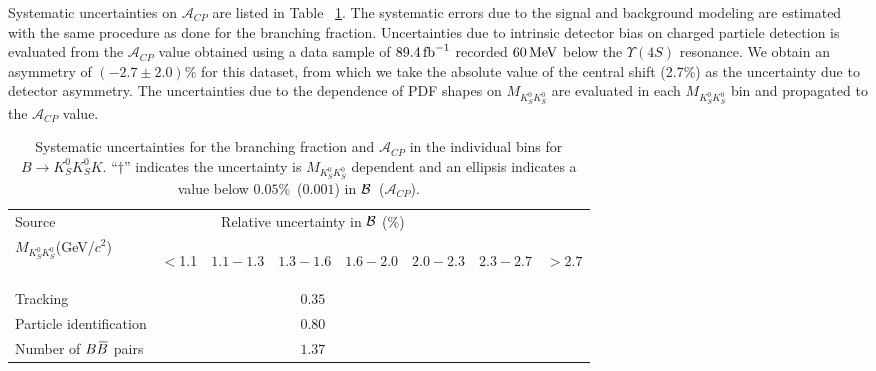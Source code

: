 \documentclass[aps,prl,preprint,tightenlines,superscriptaddress,,amsmath,byrevtex]{revtex4}
\def\KS     {\ensuremath{K^0_{\scriptscriptstyle S}}\xspace}
\def\Bbar   {\kern 0.18em\overline{\kern -0.18em B}{}\xspace}
\def\BB     {\ensuremath{B\Bbar}\xspace}
\newcommand{\mkk}{\ensuremath{M_{K_{S}^{0}K_{S}^{0}}}\xspace}
\def\invfb{\ensuremath{\mbox{\,fb}^{-1}}\xspace}
\def\to{\ensuremath{\rightarrow}\xspace}
\def\CP {\ensuremath{C\!P}\xspace}
\def\ACP{{\ensuremath{\mathcal{A}_{\CP}}\xspace}}
\newcommand{\mev}{\ensuremath{\mathrm{\,Me\kern -0.1em V}}\xspace}
\begin{document}
Systematic uncertainties on $\ACP$ are listed in Table ~\ref{tab:sysm}. The systematic errors due to the signal and  background  modeling are estimated with the same procedure as done for the branching fraction. Uncertainties due to intrinsic detector bias on charged particle detection is evaluated from the $\ACP$ value obtained using a data sample of $89.4 \invfb$ recorded $60 \mev$ below the $\Upsilon(4S)$ resonance. We obtain an asymmetry of $(-2.7 \pm 2.0)\%$ for this dataset, from which we take the absolute value of the central shift (2.7\%) as the uncertainty due to detector asymmetry. The uncertainties due to the dependence of PDF shapes on $\mkk$ are evaluated in each $\mkk$ bin and propagated to the $\ACP$ value.
  

\begin{table}[H]
\caption{\label{tab:sysm}Systematic uncertainties for the branching fraction and $\ACP$ in the individual bins for $B \to\KS\KS K$. ``$\dagger$'' indicates the uncertainty is $\mkk$ dependent and an ellipsis indicates a value below $0.05\%$~($0.001$) in $\cal B$~($\ACP$).}
\begin{center}
\begin{tabular}{lccccccc}
\hline\hline
{Source} &  \multicolumn{5}{c}{Relative uncertainty in ${\cal B}$ ($\%$)} \\
$\mkk$(GeV/$c^2$) &  \begin{scriptsize} $<$1.1 \end{scriptsize} & \begin{scriptsize}$1.1-1.3$   \end{scriptsize}  &  \begin{scriptsize}$1.3-1.6$ \end{scriptsize}   &  \begin{scriptsize} $1.6-2.0$  \end{scriptsize}  &  \begin{scriptsize} $2.0-2.3$  \end{scriptsize} &  \begin{scriptsize} $2.3-2.7$  \end{scriptsize} &  \begin{scriptsize} $> 2.7$ \end{scriptsize} \\
\hline
Tracking & \multicolumn{5}{c}{$0.35$} \\
Particle identification & \multicolumn{5}{c}{$0.80$} \\
Number of $\BB$ pairs & \multicolumn{5}{c}{$1.37$} \\

\end{tabular}
\end{center}
\end{table}
\end{document}
